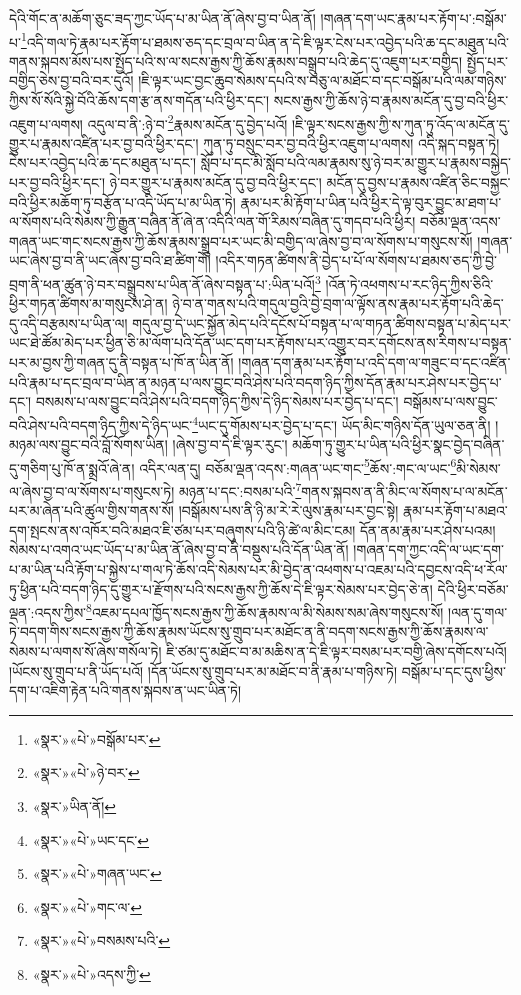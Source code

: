 དེའི་གོང་ན་མཆོག་ཅུང་ཟད་ཀྱང་ཡོད་པ་མ་ཡིན་ནོ་ཞེས་བྱ་བ་ཡིན་ནོ། །གཞན་དག་ཡང་རྣམ་པར་རྟོག་པ་:བསྒོམ་པ་\footnote{«སྣར་»«པེ་»བསྒོམ་པར་}འདི་གལ་ཏེ་རྣམ་པར་རྟོག་པ་ཐམས་ཅད་དང་བྲལ་བ་ཡིན་ན་དེ་ཇི་ལྟར་ངེས་པར་འབྱེད་པའི་ཆ་དང་མཐུན་པའི་གནས་སྐབས་མོས་པས་སྤྱོད་པའི་ས་ལ་སངས་རྒྱས་ཀྱི་ཆོས་རྣམས་བསྒྲུབ་པའི་ཆེད་དུ་འཇུག་པར་བགྱིད། སྤྱོད་པར་བགྱིད་ཅེས་བྱ་བའི་བར་དུའོ། །ཇི་ལྟར་ཡང་བྱང་ཆུབ་སེམས་དཔའི་ས་བཅུ་ལ་མཐོང་བ་དང་བསྒོམ་པའི་ལམ་གཉིས་ཀྱིས་སོ་སོའི་སྐྱེ་བོའི་ཆོས་དག་རྩ་ནས་གདོན་པའི་ཕྱིར་དང་། སངས་རྒྱས་ཀྱི་ཆོས་ཉེ་བ་རྣམས་མངོན་དུ་བྱ་བའི་ཕྱིར་འཇུག་པ་ལགས། འདུལ་བ་ནི་:ཉེ་བ་\footnote{«སྣར་»«པེ་»ཉེ་བར་}རྣམས་མངོན་དུ་བྱེད་པའོ། །ཇི་ལྟར་སངས་རྒྱས་ཀྱི་ས་ཀུན་ཏུ་འོད་ལ་མངོན་དུ་གྱུར་པ་རྣམས་འཛིན་པར་བྱ་བའི་ཕྱིར་དང་། ཀུན་ཏུ་བསྲུང་བར་བྱ་བའི་ཕྱིར་འཇུག་པ་ལགས། འདི་སྐད་བསྟན་ཏེ། ངེས་པར་འབྱེད་པའི་ཆ་དང་མཐུན་པ་དང་། སློབ་པ་དང་མི་སློབ་པའི་ལམ་རྣམས་སུ་ཉེ་བར་མ་གྱུར་པ་རྣམས་བསྐྱེད་པར་བྱ་བའི་ཕྱིར་དང་། ཉེ་བར་གྱུར་པ་རྣམས་མངོན་དུ་བྱ་བའི་ཕྱིར་དང་། མངོན་དུ་བྱས་པ་རྣམས་འཛིན་ཅིང་བསྐྱང་བའི་ཕྱིར་མཆོག་ཏུ་བརྩོན་པ་འདི་ཡོད་པ་མ་ཡིན་ཏེ། རྣམ་པར་མི་རྟོག་པ་ཡིན་པའི་ཕྱིར་དེ་ལྟ་བུར་བྱུང་མ་ཐག་པ་ལ་སོགས་པའི་སེམས་ཀྱི་རྒྱུན་བཞིན་ནོ་ཞེ་ན་འདིའི་ལན་གོ་རིམས་བཞིན་དུ་གདབ་པའི་ཕྱིར། བཅོམ་ལྡན་འདས་གཞན་ཡང་གང་སངས་རྒྱས་ཀྱི་ཆོས་རྣམས་སྒྲུབ་པར་ཡང་མི་བགྱིད་ལ་ཞེས་བྱ་བ་ལ་སོགས་པ་གསུངས་སོ། །གཞན་ཡང་ཞེས་བྱ་བ་ནི་ཡང་ཞེས་བྱ་བའི་ཐ་ཚིག་གོ། །འདིར་གཏན་ཚིགས་ནི་བྱེད་པ་པོ་ལ་སོགས་པ་ཐམས་ཅད་ཀྱི་བྱེ་བྲག་ནི་ཕན་ཚུན་ཉེ་བར་བསྒྲུབས་པ་ཡིན་ནོ་ཞེས་བསྟན་པ་:ཡིན་པའོ།\footnote{«སྣར་»ཡིན་ནོ།} །འོན་ཏེ་འཕགས་པ་རང་ཉིད་ཀྱིས་ཅིའི་ཕྱིར་གཏན་ཚིགས་མ་གསུངས་ཤེ་ན། ཉེ་བ་ན་གནས་པའི་གདུལ་བྱའི་བྱེ་བྲག་ལ་ལྟོས་ནས་རྣམ་པར་རྟོག་པའི་ཆེད་དུ་འདི་བརྩམས་པ་ཡིན་ལ། གདུལ་བྱ་དེ་ཡང་སྐྱོན་མེད་པའི་དངོས་པོ་བསྟན་པ་ལ་གཏན་ཚིགས་བསྟན་པ་མེད་པར་ཡང་ཐེ་ཚོམ་མེད་པར་ཕྱིན་ཅི་མ་ལོག་པའི་དོན་ཡང་དག་པར་རྟོགས་པར་འགྱུར་བར་དགོངས་ནས་རིགས་པ་བསྟན་པར་མ་བྱས་ཀྱི་གཞན་དུ་ནི་བསྟན་པ་ཁོ་ན་ཡིན་ནོ། །གཞན་དག་རྣམ་པར་རྟོག་པ་འདི་དག་ལ་གཟུང་བ་དང་འཛིན་པའི་རྣམ་པ་དང་བྲལ་བ་ཡིན་ན་མཉན་པ་ལས་བྱུང་བའི་ཤེས་པའི་བདག་ཉིད་ཀྱིས་དོན་རྣམ་པར་ཤེས་པར་བྱེད་པ་དང་། བསམས་པ་ལས་བྱུང་བའི་ཤེས་པའི་བདག་ཉིད་ཀྱིས་དེ་ཉིད་སེམས་པར་བྱེད་པ་དང་། བསྒོམས་པ་ལས་བྱུང་བའི་ཤེས་པའི་བདག་ཉིད་ཀྱིས་དེ་ཉིད་ཡང་\footnote{«སྣར་»«པེ་»ཡང་དང་}ཡང་དུ་གོམས་པར་བྱེད་པ་དང་། ཡོད་མིང་གཉིས་དོན་ཡུལ་ཅན་ནི། །མཉམ་ལས་བྱུང་བའི་བློ་སོགས་ཡིན། །ཞེས་བྱ་བ་དེ་ཇི་ལྟར་རུང་། མཆོག་ཏུ་གྱུར་པ་ཡིན་པའི་ཕྱིར་སྣང་བྱེད་བཞིན་དུ་གཅིག་པུ་ཁོ་ན་སྨྲའོ་ཞེ་ན། འདིར་ལན་དུ། བཅོམ་ལྡན་འདས་:གཞན་ཡང་གང་\footnote{«སྣར་»«པེ་»གཞན་ཡང་}ཆོས་:གང་ལ་ཡང་\footnote{«སྣར་»«པེ་»གང་ལ་}མི་སེམས་ལ་ཞེས་བྱ་བ་ལ་སོགས་པ་གསུངས་ཏེ། མཉན་པ་དང་:བསམ་པའི་\footnote{«སྣར་»«པེ་»བསམས་པའི་}གནས་སྐབས་ན་ནི་མིང་ལ་སོགས་པ་ལ་མངོན་པར་མ་ཞེན་པའི་ཚུལ་གྱིས་གནས་སོ། །བསྒོམས་པས་ནི་ཉི་མ་རེ་རེ་ལུས་རྣམ་པར་བྱང་སྟེ། རྣམ་པར་རྟོག་པ་མཐའ་དག་སྤངས་ནས་འཁོར་བའི་མཐའ་ཇི་ཙམ་པར་བཞུགས་པའི་ཉི་ཚེ་ལ་མིང་ངམ། དོན་ནམ་རྣམ་པར་ཤེས་པའམ། སེམས་པ་འགའ་ཡང་ཡོད་པ་མ་ཡིན་ནོ་ཞེས་བྱ་བ་ནི་བསྡུས་པའི་དོན་ཡིན་ནོ། །གཞན་དག་ཀྱང་འདི་ལ་ཡང་དག་པ་མ་ཡིན་པའི་རྟོག་པ་སྐྱེས་པ་གལ་ཏེ་ཆོས་འདི་སེམས་པར་མི་བྱེད་ན་འཕགས་པ་འཇམ་པའི་དབྱངས་འདི་ཕ་རོལ་ཏུ་ཕྱིན་པའི་བདག་ཉིད་དུ་གྱུར་པ་རྫོགས་པའི་སངས་རྒྱས་ཀྱི་ཆོས་དེ་ཇི་ལྟར་སེམས་པར་བྱེད་ཅེ་ན། དེའི་ཕྱིར་བཅོམ་ལྡན་:འདས་ཀྱིས་\footnote{«སྣར་»«པེ་»འདས་ཀྱི་}འཇམ་དཔལ་ཁྱོད་སངས་རྒྱས་ཀྱི་ཆོས་རྣམས་ལ་མི་སེམས་སམ་ཞེས་གསུངས་སོ། །ལན་དུ་གལ་ཏེ་བདག་གིས་སངས་རྒྱས་ཀྱི་ཆོས་རྣམས་ཡོངས་སུ་གྲུབ་པར་མཐོང་ན་ནི་བདག་སངས་རྒྱས་ཀྱི་ཆོས་རྣམས་ལ་སེམས་པ་ལགས་སོ་ཞེས་གསོལ་ཏེ། ཇི་ཙམ་དུ་མཐོང་བ་མ་མཆིས་ན་དེ་ཇི་ལྟར་བསམ་པར་བགྱི་ཞེས་དགོངས་པའོ། །ཡོངས་སུ་གྲུབ་པ་ནི་ཡོད་པའོ། །དོན་ཡོངས་སུ་གྲུབ་པར་མ་མཐོང་བ་ནི་རྣམ་པ་གཉིས་ཏེ། བསྒོམ་པ་དང་དུས་ཕྱིས་དག་པ་འཇིག་རྟེན་པའི་གནས་སྐབས་ན་ཡང་ཡིན་ཏེ། 